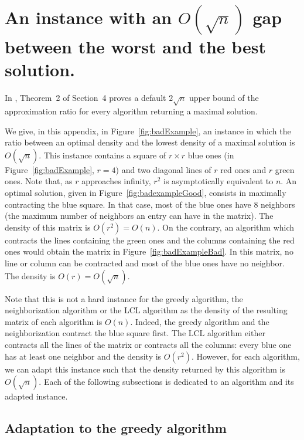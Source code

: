 \section{An instance with an $O(\sqrt{n})$ gap between the worst and the best solution.}

\label{apx:badinstance}


In \cite{WP16}, Theorem~2 of Section~4 proves a default $2\sqrt{n}$ upper bound of the approximation ratio for every algorithm returning a maximal solution.

We give, in this appendix, in Figure~\ref{fig:badExample}, an instance in which the ratio between an optimal density and the lowest density of a maximal solution is $O(\sqrt{n})$. This instance contains a square of $r \times r$ blue ones (in Figure~\ref{fig:badExample}, $r = 4$) and two diagonal lines of $r$ red ones and $r$ green ones. Note that, as $r$ approaches infinity, $r^2$ is asymptotically equivalent to $n$. An optimal solution, given in Figure~\ref{fig:badexampleGood}, consists in maximally contracting the blue square. In that case, most of the blue ones have 8 neighbors (the maximum number of neighbors an entry can have in the matrix). The density of this matrix is $O(r^2) = O(n)$. On the contrary, an algorithm which contracts the lines containing the green ones and the columns containing the red ones would obtain the matrix in Figure~\ref{fig:badExampleBad}. In this matrix, no line or column can be contracted and most of the blue ones have no neighbor. The density is $O(r) = O(\sqrt{n})$. 







Note that this is not a hard instance for the greedy algorithm, the neighborization algorithm or the LCL algorithm as the density of the resulting matrix of each algorithm is $O(n)$. Indeed, the greedy algorithm and the neighborization contract the blue square first. The LCL algorithm either contracts all the lines of the matrix or contracts all the columns: every blue one has at least one neighbor and the density is $O(r^2)$. However, for each algorithm, we can adapt this instance such that the density returned by this algorithm is $O(\sqrt{n})$. Each of the following subsections is dedicated to an algorithm and its adapted instance. 

\subsection{Adaptation to the greedy algorithm}

